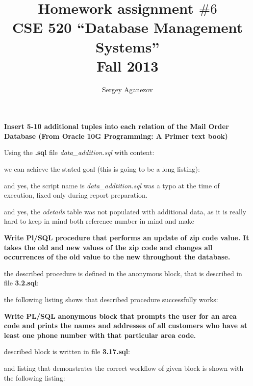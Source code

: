 \documentclass{article}
\author{Sergey Aganezov}
\title{Homework assignment $\#6$ \\ CSE 520 ``Database Management Systems'' \\ Fall 2013}
\date{}
\newenvironment{problem}[1][\unskip]%
{\centering\textbf{ #1}%
\vspace{0.5cm}
\begin{em}}%
{\end{em}}
\newenvironment{answer}%
{\begin{framed}%
\vspace{0.5cm}}%
{\end{framed}\vspace{0.5cm}}
\begin{document}
	\maketitle
	\newpage
	\begin{problem}[ Insert 5-10 additional tuples into each relation of the Mail Order Database (From Oracle 10G Programming: A Primer text book)]
	\end{problem}	
	\begin{answer}
		Using the \textbf{.sql} file \emph{data\_addition.sql} with content:
		

		we can achieve the stated goal (this is going to be a long listing):
		

		and yes, the script name is \emph{data\_addtition.sql} was a typo at the time of execution, fixed only during report preparation.

		and yes, the \emph{odetails} table was not populated with additional data, as it is really hard to keep in mind both reference number in mind and make  
	\end{answer}
	\begin{problem}[Write Pl/SQL procedure that performs an update of zip code value. It takes the old and new values of the zip code and changes all occurrences of the old value to the new throughout the database.]
	\end{problem}
	\begin{answer}
		the described procedure is defined in the anonymous block, that is described in file \textbf{3.2.sql}:
		

		the following listing shows that described procedure successfully works:
		
	\end{answer}
	\begin{problem}[Write PL/SQL anonymous block that prompts the user for an area code and prints the names and addresses of all customers who have at least one phone number with that particular area code.]
	\end{problem}
	\begin{answer}
		described block is written in file \textbf{3.17.sql}:
		

		and listing that demonstrates the correct workflow of given block is shown with the following listing:
		
	\end{answer}
\end{document}
